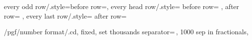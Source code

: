 
            
\pgfplotstableset
{
  every odd row/.style={before row={}},
  every head row/.style=
  {
    before row=
    {%
      \toprule
    },
    after row=\midrule
  },
  every last row/.style=
  {
    after row=\bottomrule
  }
}

\newif\ifdrawboundingbox

 


\pgfkeys
{ 
  /pgf/number format/.cd,
  fixed,
  set thousands separator={\,},
  1000 sep in fractionals,
}
